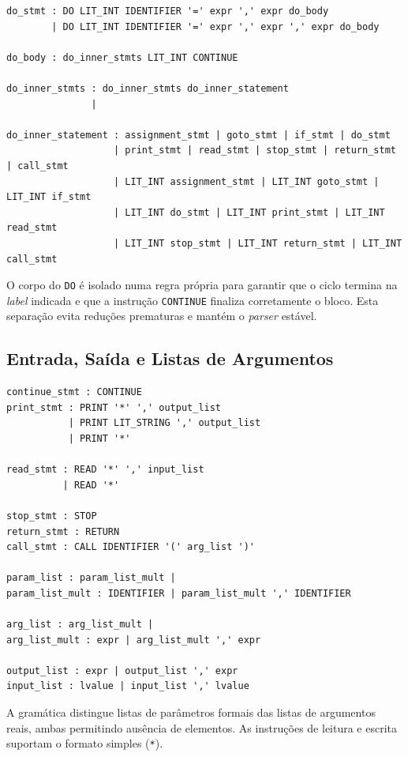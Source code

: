 \documentclass[11pt, a4paper, fleqn]{article}
\begin{document}
\begin{lstlisting}
do_stmt : DO LIT_INT IDENTIFIER '=' expr ',' expr do_body
        | DO LIT_INT IDENTIFIER '=' expr ',' expr ',' expr do_body

do_body : do_inner_stmts LIT_INT CONTINUE

do_inner_stmts : do_inner_stmts do_inner_statement
               |

do_inner_statement : assignment_stmt | goto_stmt | if_stmt | do_stmt 
                   | print_stmt | read_stmt | stop_stmt | return_stmt | call_stmt
                   | LIT_INT assignment_stmt | LIT_INT goto_stmt | LIT_INT if_stmt 
                   | LIT_INT do_stmt | LIT_INT print_stmt | LIT_INT read_stmt 
                   | LIT_INT stop_stmt | LIT_INT return_stmt | LIT_INT call_stmt
\end{lstlisting}

\noindent O corpo do \texttt{DO} é isolado numa regra própria para garantir que o ciclo termina na \textit{label} indicada e que a instrução \texttt{CONTINUE} finaliza corretamente o bloco. Esta separação evita reduções prematuras e mantém o \textit{parser} estável.

\subsection{Entrada, Saída e Listas de Argumentos}

\begin{lstlisting}
continue_stmt : CONTINUE
print_stmt : PRINT '*' ',' output_list
           | PRINT LIT_STRING ',' output_list
           | PRINT '*'

read_stmt : READ '*' ',' input_list
          | READ '*'

stop_stmt : STOP
return_stmt : RETURN
call_stmt : CALL IDENTIFIER '(' arg_list ')'

param_list : param_list_mult |
param_list_mult : IDENTIFIER | param_list_mult ',' IDENTIFIER

arg_list : arg_list_mult |
arg_list_mult : expr | arg_list_mult ',' expr

output_list : expr | output_list ',' expr
input_list : lvalue | input_list ',' lvalue
\end{lstlisting}

\noindent A gramática distingue listas de parâmetros formais das listas de argumentos reais, ambas permitindo ausência de elementos. As instruções de leitura e escrita suportam o formato simples (\texttt{*}).
\end{document}
